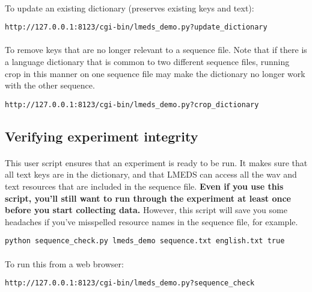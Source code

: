 \paragraph{}
To update an existing dictionary (preserves existing keys and text):
\begin{lstlisting}
http://127.0.0.1:8123/cgi-bin/lmeds_demo.py?update_dictionary
\end{lstlisting}

\paragraph{}
To remove keys that are no longer relevant to a sequence file.  Note that if there is a language dictionary
that is common to two different sequence files, running crop in this manner on one sequence file may
make the dictionary no longer work with the other sequence.
\begin{lstlisting}
http://127.0.0.1:8123/cgi-bin/lmeds_demo.py?crop_dictionary
\end{lstlisting}



\subsection{Verifying experiment integrity}

\paragraph{}
This user script ensures that an experiment is ready to be run.  It makes sure that all text keys are in the dictionary, and that LMEDS can access all the wav and text resources that are included in the sequence file.  \textbf{Even if you use this script, you'll still want to run through the experiment at least once before you start collecting data.}  However, this script will save you some headaches if you've misspelled resource names in the sequence file, for example.

\begin{lstlisting}
python sequence_check.py lmeds_demo sequence.txt english.txt true
\end{lstlisting}

\paragraph{}
To run this from a web browser:
\begin{lstlisting}
http://127.0.0.1:8123/cgi-bin/lmeds_demo.py?sequence_check
\end{lstlisting}



